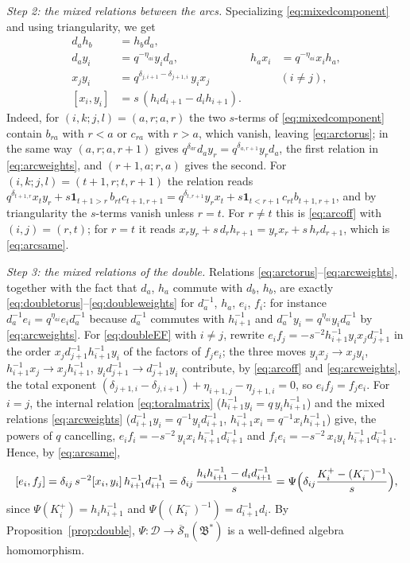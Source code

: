 \documentclass[11pt]{article}
\theoremstyle{remark}
\newcommand{\redS}{\overline{\mathcal S}_n}
\newcommand{\Bstar}{\mathfrak B^*}
\newcommand{\cD}{\mathcal D}
\begin{document}
\emph{Step 2: the mixed relations between the arcs.} Specializing
\eqref{eq:mixedcomponent} and using triangularity, we get
\begin{align}
 d_ah_b&=h_bd_a, \label{eq:arctorus}\\
 d_ay_i&=q^{-\eta_{ai}}y_id_a,&
 h_ax_i&=q^{-\eta_{ai}}x_ih_a, \label{eq:arcweights}\\
 x_jy_i&=q^{\delta_{j,i+1}-\delta_{j+1,i}}\,y_ix_j
                                                    &&(i\ne j), \label{eq:arcoff}\\
 [x_i,y_i]&=s\,(h_id_{i+1}-d_ih_{i+1}). \label{eq:arcsame}
\end{align}
Indeed, for $(i,k;j,l)=(a,r;a,r)$ the two $s$-terms of
\eqref{eq:mixedcomponent} contain $b_{ra}$ with $r<a$ or $c_{ra}$ with
$r>a$, which vanish, leaving \eqref{eq:arctorus}; in the same way
$(a,r;a,r+1)$ gives $q^{\delta_{ar}}d_ay_r=q^{\delta_{a,r+1}}y_rd_a$,
the first relation in \eqref{eq:arcweights}, and $(r+1,a;r,a)$ gives
the second. For $(i,k;j,l)=(t+1,r;t,r+1)$ the relation reads
$q^{\delta_{t+1,r}}x_ty_r+s\mathbf1_{t+1>r}\,b_{rt}c_{t+1,r+1}
 =q^{\delta_{t,r+1}}y_rx_t+s\mathbf1_{t<r+1}\,c_{rt}b_{t+1,r+1}$,
and by triangularity the $s$-terms vanish unless $r=t$. For $r\ne t$
this is \eqref{eq:arcoff} with $(i,j)=(r,t)$; for $r=t$ it reads
$x_ry_r+s\,d_rh_{r+1}=y_rx_r+s\,h_rd_{r+1}$, which is
\eqref{eq:arcsame}.

\emph{Step 3: the mixed relations of the double.} Relations
\eqref{eq:arctorus}--\eqref{eq:arcweights}, together with the fact
that $d_a$, $h_a$ commute with $d_b$, $h_b$, are exactly
\eqref{eq:doubletorus}--\eqref{eq:doubleweights} for $d_a^{-1}$, $h_a$,
$e_i$, $f_i$: for instance $d_a^{-1}e_i=q^{\eta_{ai}}e_id_a^{-1}$
because $d_a^{-1}$ commutes with $h_{i+1}^{-1}$ and
$d_a^{-1}y_i=q^{\eta_{ai}}y_id_a^{-1}$ by \eqref{eq:arcweights}. For
\eqref{eq:doubleEF} with $i\ne j$, rewrite
$e_if_j=-s^{-2}h_{i+1}^{-1}y_ix_jd_{j+1}^{-1}$ in the order
$x_jd_{j+1}^{-1}h_{i+1}^{-1}y_i$ of the factors of $f_je_i$; the three
moves
$y_ix_j\to x_jy_i$, $h_{i+1}^{-1}x_j\to x_jh_{i+1}^{-1}$,
$y_id_{j+1}^{-1}\to d_{j+1}^{-1}y_i$ contribute, by \eqref{eq:arcoff}
and \eqref{eq:arcweights}, the total exponent
$(\delta_{j+1,i}-\delta_{j,i+1})+\eta_{i+1,j}-\eta_{j+1,i}=0$,
so $e_if_j=f_je_i$. For $i=j$, the internal relation
\eqref{eq:toralmatrix} ($h_{i+1}^{-1}y_i=q\,y_ih_{i+1}^{-1}$) and the
mixed relations \eqref{eq:arcweights}
($d_{i+1}^{-1}y_i=q^{-1}y_id_{i+1}^{-1}$,
$h_{i+1}^{-1}x_i=q^{-1}x_ih_{i+1}^{-1}$) give, the powers of $q$
cancelling,
$e_if_i=-s^{-2}\,y_ix_i\,h_{i+1}^{-1}d_{i+1}^{-1}$ and
$f_ie_i=-s^{-2}\,x_iy_i\,h_{i+1}^{-1}d_{i+1}^{-1}$.
Hence, by \eqref{eq:arcsame},
\begin{equation}\label{eq:verifiedEF}
 [e_i,f_j]=\delta_{ij}\,s^{-2}[x_i,y_i]\,h_{i+1}^{-1}d_{i+1}^{-1}
 =\delta_{ij}\,\frac{h_ih_{i+1}^{-1}-d_id_{i+1}^{-1}}s
 =\Psi\Bigl(\delta_{ij}\frac{K^+_i-(K^-_i)^{-1}}s\Bigr),
\end{equation}
since $\Psi(K^+_i)=h_ih_{i+1}^{-1}$ and
$\Psi((K^-_i)^{-1})=d_{i+1}^{-1}d_i$. By Proposition~\ref{prop:double},
$\Psi:\cD\to\redS(\Bstar)$ is a well-defined algebra homomorphism.
\end{document}
